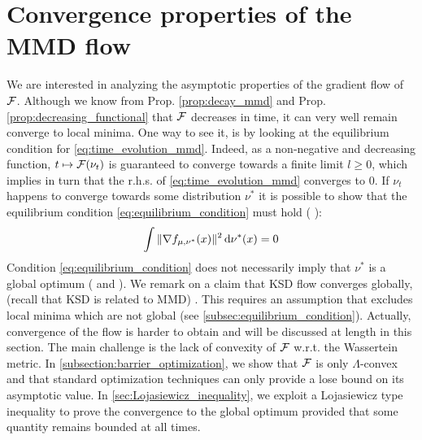 

\section{Convergence properties of the MMD flow}\label{sec:convergence_mmd_flow}
We are interested in analyzing the asymptotic properties of the gradient flow of ${{\mathcal F}}$. %
Although we know from Prop. \ref{prop:decay_mmd} and Prop. \ref{prop:decreasing_functional} that ${{\mathcal F}}$ decreases in time, it can very well remain converge to local minima. One way to see it, is by looking at the equilibrium condition for \cref{eq:time_evolution_mmd}. Indeed, as a non-negative and decreasing function, $t \mapsto {{\mathcal F}}(\nu_t)$  is guaranteed to converge towards a finite limit $l\ge0$, which implies in turn that the r.h.s. of \cref{eq:time_evolution_mmd} converges to $0$. If $\nu_t$ happens to converge towards some distribution $\nu^{*}$ %
it is possible to show that the equilibrium condition \cref{eq:equilibrium_condition} must hold (\cite[Prop. 2]{mei2018mean}
):
\begin{align}\label{eq:equilibrium_condition}
\int \Vert \nabla f_{\mu,\nu^{*}}(x)\Vert^2 \mathop{}\!\mathrm{d} \nu^{*}(x) =0  
\end{align}
Condition \cref{eq:equilibrium_condition} does not necessarily imply that $\nu^{*}$ is a global optimum (\cite[Th. 6]{mei2018mean} and \cite{rotskoff2019global}). 
We remark on a claim that  KSD flow converges globally, (recall that KSD is related to MMD) \cite[Prop. 3, Appendix B.1]{Mroueh:2019}. This  requires an assumption \cite[Assump. A]{Mroueh:2019} that excludes local minima which are not global (see \cref{subsec:equilibrium_condition}).
Actually, convergence of the flow is harder to obtain and will be discussed at length in this section. The main challenge is the lack of convexity of ${{\mathcal F}}$ w.r.t. the Wassertein metric. In  \cref{subsection:barrier_optimization}, we show that ${{\mathcal F}}$ is only $\Lambda$-convex and that standard optimization techniques can only provide a lose bound on its asymptotic value.
In \cref{sec:Lojasiewicz_inequality}, we exploit a Lojasiewicz type inequality to prove the convergence to the global optimum provided that some quantity remains bounded at all times. 

